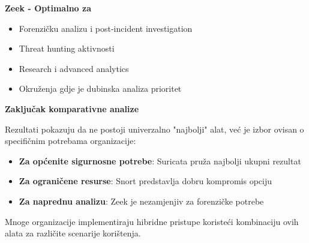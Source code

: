 \textbf{Zeek - Optimalno za}
\begin{itemize}
\item Forenzičku analizu i post-incident investigation
\item Threat hunting aktivnosti
\item Research i advanced analytics
\item Okruženja gdje je dubinska analiza prioritet
\end{itemize}

\textbf{Zaključak komparativne analize}

Rezultati pokazuju da ne postoji univerzalno "najbolji" alat, već je izbor ovisan o specifičnim potrebama organizacije:

\begin{itemize}
\item \textbf{Za općenite sigurnosne potrebe}: Suricata pruža najbolji ukupni rezultat
\item \textbf{Za ograničene resurse}: Snort predstavlja dobru kompromis opciju
\item \textbf{Za naprednu analizu}: Zeek je nezamjenjiv za forenzičke potrebe
\end{itemize}

Mnoge organizacije implementiraju hibridne pristupe koristeći kombinaciju ovih alata za različite scenarije korištenja.